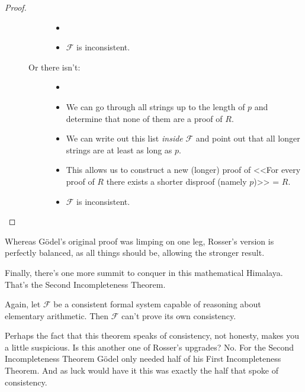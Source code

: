 \documentclass{article}
\theoremstyle{customstyle}
\newcommand{\F}{\ensuremath{\mathcal{F}}}
\begin{document}
\begin{proof}
\begin{description}
\begin{description}
\begin{itemize}
\item[]
\item $\F$ is inconsistent. \lightning
\end{itemize}
\item[Or there isn't:]
\begin{itemize}
\item[]
\item We can go through all strings up to the length of $p$ and determine that none of them are a proof of $R$.
\item We can write out this list \textit{inside} $\F$ and point out that all longer strings are at least as long as $p$.
\item This allows us to construct a new (longer) proof of <<For every proof of $R$ there exists a shorter disproof (namely $p$)>> = $R$.
\item $\F$ is inconsistent. \lightning
\end{itemize}
\end{description}
\end{description}
\end{proof}

Whereas Gödel's original proof was limping on one leg, Rosser's version is perfectly balanced, as all things should be, allowing the stronger result.

Finally, there's one more summit to conquer in this mathematical Himalaya. That's the Second Incompleteness Theorem.

\begin{theorem}
Again, let $\F$ be a consistent formal system capable of reasoning about elementary arithmetic. Then $\F$ can't prove its own consistency.
\end{theorem}

Perhaps the fact that this theorem speaks of consistency, not honesty, makes you a little suspicious. Is this another one of Rosser's upgrades? No. For the Second Incompleteness Theorem Gödel only needed half of his First Incompleteness Theorem. And as luck would have it this was exactly the half that spoke of consistency.
\end{document}
